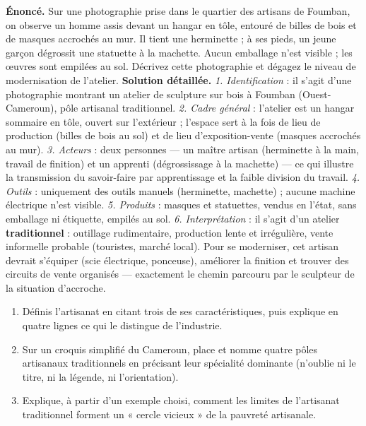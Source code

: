 \documentclass[11pt]{article}
\begin{document}
\begin{exoresolu}
\textbf{Énoncé.} Sur une photographie prise dans le quartier des artisans de Foumban, on observe un homme assis devant un hangar en tôle, entouré de billes de bois et de masques accrochés au mur. Il tient une herminette ; à ses pieds, un jeune garçon dégrossit une statuette à la machette. Aucun emballage n'est visible ; les œuvres sont empilées au sol. Décrivez cette photographie et dégagez le niveau de modernisation de l'atelier.
\tcblower
\textbf{Solution détaillée.}
\emph{1. Identification} : il s'agit d'une photographie montrant un atelier de sculpture sur bois à Foumban (Ouest-Cameroun), pôle artisanal traditionnel.
\emph{2. Cadre général} : l'atelier est un hangar sommaire en tôle, ouvert sur l'extérieur ; l'espace sert à la fois de lieu de production (billes de bois au sol) et de lieu d'exposition-vente (masques accrochés au mur).
\emph{3. Acteurs} : deux personnes — un maître artisan (herminette à la main, travail de finition) et un apprenti (dégrossissage à la machette) — ce qui illustre la transmission du savoir-faire par apprentissage et la faible division du travail.
\emph{4. Outils} : uniquement des outils manuels (herminette, machette) ; aucune machine électrique n'est visible.
\emph{5. Produits} : masques et statuettes, vendus en l'état, sans emballage ni étiquette, empilés au sol.
\emph{6. Interprétation} : il s'agit d'un atelier \textbf{traditionnel} : outillage rudimentaire, production lente et irrégulière, vente informelle probable (touristes, marché local). Pour se moderniser, cet artisan devrait s'équiper (scie électrique, ponceuse), améliorer la finition et trouver des circuits de vente organisés — exactement le chemin parcouru par le sculpteur de la situation d'accroche.
\end{exoresolu}

\begin{exercice}
\begin{enumerate}
\item Définis l'artisanat en citant trois de ses caractéristiques, puis explique en quatre lignes ce qui le distingue de l'industrie.
\item Sur un croquis simplifié du Cameroun, place et nomme quatre pôles artisanaux traditionnels en précisant leur spécialité dominante (n'oublie ni le titre, ni la légende, ni l'orientation).
\item Explique, à partir d'un exemple choisi, comment les limites de l'artisanat traditionnel forment un « cercle vicieux » de la pauvreté artisanale.
\end{enumerate}
\end{exercice}
\end{document}
